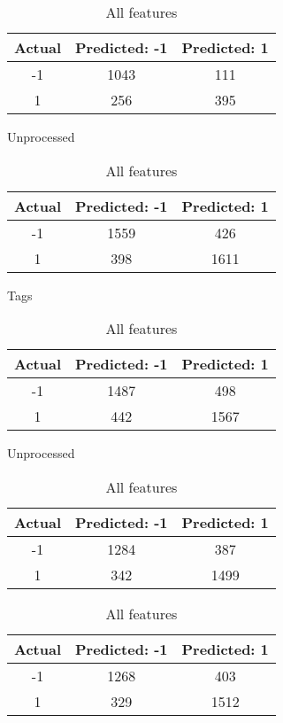 \begin{table}[!htb]
\begin{minipage}{.5\linewidth}
\begin{tabular}{| c | c | c |}
			Actual 		& Predicted: -1	& Predicted: 1	\\ \hline
			-1			& 1043			& 111			\\ \hline
			1			& 256			& 395			\\ \hline
		\end{tabular}
	\end{minipage} 	
	\begin{minipage}{.5\linewidth}
		\centering
		\caption{Unprocessed}
		\begin{tabular}{| c | c | c |}
			\hline
			Actual 		& Predicted: -1	& Predicted: 1	\\ \hline
			-1			& 1559			& 426			\\ \hline
			1			& 398			& 1611			\\ \hline
		\end{tabular}
	\end{minipage}%
	\begin{minipage}{.5\linewidth}
		\caption{Tags}
		\centering
		\begin{tabular}{| c | c | c |}
			\hline
			Actual 		& Predicted: -1	& Predicted: 1	\\ \hline
			-1			& 1487			& 498			\\ \hline
			1			& 442			& 1567			\\ \hline
		\end{tabular}
	\end{minipage}
	\begin{minipage}{.5\linewidth}
		\caption{Unprocessed}
		\centering
		\begin{tabular}{| c | c | c |}
			\hline
			Actual 		& Predicted: -1	& Predicted: 1	\\ \hline
			-1			& 1284			& 387			\\ \hline
			1			& 342			& 1499			\\ \hline
		\end{tabular}
	\end{minipage}%
	\begin{minipage}{.5\linewidth}
		\caption{All features}
		\centering
		\begin{tabular}{| c | c | c |}
			\hline
			Actual 		& Predicted: -1	& Predicted: 1	\\ \hline
			-1			& 1268			& 403			\\ \hline
			1			& 329			& 1512			\\ \hline
		\end{tabular}
	\end{minipage}
\end{table}	

